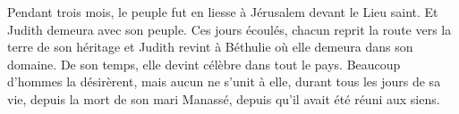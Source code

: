 Pendant trois mois, le peuple fut en liesse à Jérusalem devant le Lieu saint.
	Et Judith demeura avec son peuple.
Ces jours écoulés, chacun reprit la route vers la terre de son héritage
	et Judith revint à Béthulie où elle demeura dans son domaine.
De son temps, elle devint célèbre dans tout le pays.
Beaucoup d’hommes la désirèrent,
	mais aucun ne s’unit à elle, durant tous les jours de sa vie,
	depuis la mort de son mari Manassé, depuis qu’il avait été réuni aux siens.
